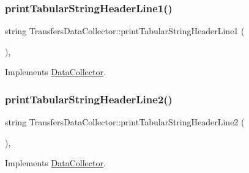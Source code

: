 \mbox{\label{classTransfersDataCollector_a7c797fbccf4326b206b29529059dd622_a7c797fbccf4326b206b29529059dd622}} 
\subsubsection{\texorpdfstring{print\+Tabular\+String\+Header\+Line1()}{printTabularStringHeaderLine1()}}
{\footnotesize\ttfamily string Transfers\+Data\+Collector\+::print\+Tabular\+String\+Header\+Line1 (\begin{DoxyParamCaption}{ }\end{DoxyParamCaption})\hspace{0.3cm}{\ttfamily [override]}, {\ttfamily [virtual]}}



Implements \mbox{\hyperlink{classDataCollector_a91619cfa9e9b8cefd2f7c20d5718b41e_a91619cfa9e9b8cefd2f7c20d5718b41e}{Data\+Collector}}.

\mbox{\label{classTransfersDataCollector_ade6b896383f079d8973076e6b9a8053a_ade6b896383f079d8973076e6b9a8053a}} 
\subsubsection{\texorpdfstring{print\+Tabular\+String\+Header\+Line2()}{printTabularStringHeaderLine2()}}
{\footnotesize\ttfamily string Transfers\+Data\+Collector\+::print\+Tabular\+String\+Header\+Line2 (\begin{DoxyParamCaption}{ }\end{DoxyParamCaption})\hspace{0.3cm}{\ttfamily [override]}, {\ttfamily [virtual]}}



Implements \mbox{\hyperlink{classDataCollector_af01ea961314be2164f39e6d4cd59e443_af01ea961314be2164f39e6d4cd59e443}{Data\+Collector}}.




